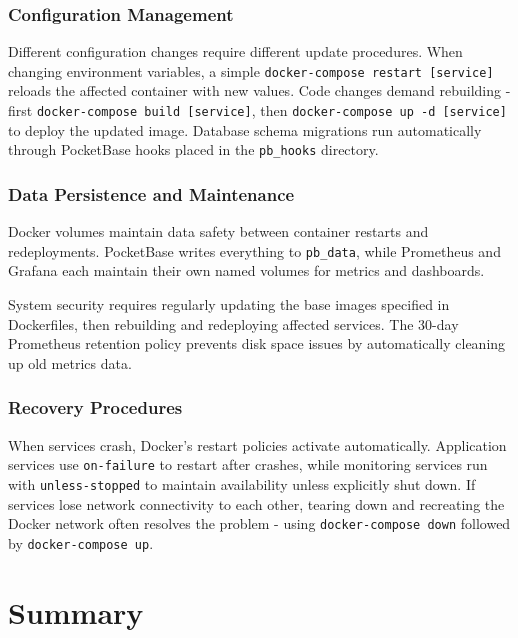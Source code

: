 \subsubsection{Configuration Management}

Different configuration changes require different update procedures. When changing environment variables, a simple \texttt{docker-compose restart [service]} reloads the affected container with new values. Code changes demand rebuilding - first \texttt{docker-compose build [service]}, then \texttt{docker-compose up -d [service]} to deploy the updated image. Database schema migrations run automatically through PocketBase hooks placed in the \texttt{pb\_hooks} directory.

\subsubsection{Data Persistence and Maintenance}

Docker volumes maintain data safety between container restarts and redeployments. PocketBase writes everything to \texttt{pb\_data}, while Prometheus and Grafana each maintain their own named volumes for metrics and dashboards.

System security requires regularly updating the base images specified in Dockerfiles, then rebuilding and redeploying affected services. The 30-day Prometheus retention policy prevents disk space issues by automatically cleaning up old metrics data.

\subsubsection{Recovery Procedures}

When services crash, Docker's restart policies activate automatically. Application services use \texttt{on-failure} to restart after crashes, while monitoring services run with \texttt{unless-stopped} to maintain availability unless explicitly shut down. If services lose network connectivity to each other, tearing down and recreating the Docker network often resolves the problem - using \texttt{docker-compose down} followed by \texttt{docker-compose up}.

\section{Summary} \label{section:implementation_summary}

